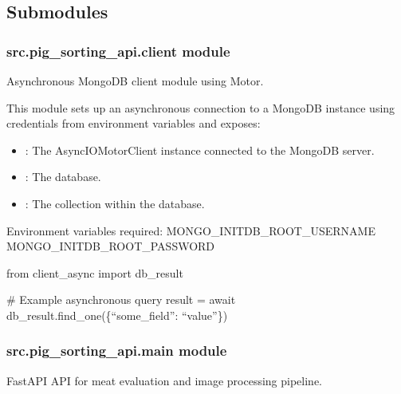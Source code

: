 \documentclass[letterpaper,10pt,english]{sphinxmanual}
\begin{document}
\subsection{Submodules}
\label{\detokenize{modules/src.pig_sorting_api:submodules}}
\sphinxstepscope


\subsubsection{src.pig\_sorting\_api.client module}
\label{\detokenize{modules/src.pig_sorting_api.client:module-src.pig_sorting_api.client}}\label{\detokenize{modules/src.pig_sorting_api.client:src-pig-sorting-api-client-module}}\label{\detokenize{modules/src.pig_sorting_api.client::doc}}
\sphinxAtStartPar
Asynchronous MongoDB client module using Motor.

\sphinxAtStartPar
This module sets up an asynchronous connection to a MongoDB instance using
credentials from environment variables and exposes:
\begin{itemize}
\item {} 
\sphinxAtStartPar
{}: The AsyncIOMotorClient instance connected to the MongoDB server.

\item {} 
\sphinxAtStartPar
{}: The  database.

\item {} 
\sphinxAtStartPar
{}: The  collection within the  database.

\end{itemize}

\sphinxAtStartPar
Environment variables required:
\sphinxhyphen{} MONGO\_INITDB\_ROOT\_USERNAME
\sphinxhyphen{} MONGO\_INITDB\_ROOT\_PASSWORD
\begin{description}
\sphinxAtStartPar
from client\_async import db\_result

\sphinxAtStartPar
\# Example asynchronous query
result = await db\_result.find\_one(\{“some\_field”: “value”\})

\end{description}

\sphinxstepscope


\subsubsection{src.pig\_sorting\_api.main module}
\label{\detokenize{modules/src.pig_sorting_api.main:module-src.pig_sorting_api.main}}\label{\detokenize{modules/src.pig_sorting_api.main:src-pig-sorting-api-main-module}}\label{\detokenize{modules/src.pig_sorting_api.main::doc}}
\sphinxAtStartPar
FastAPI API for meat evaluation and image processing pipeline.
\end{document}
